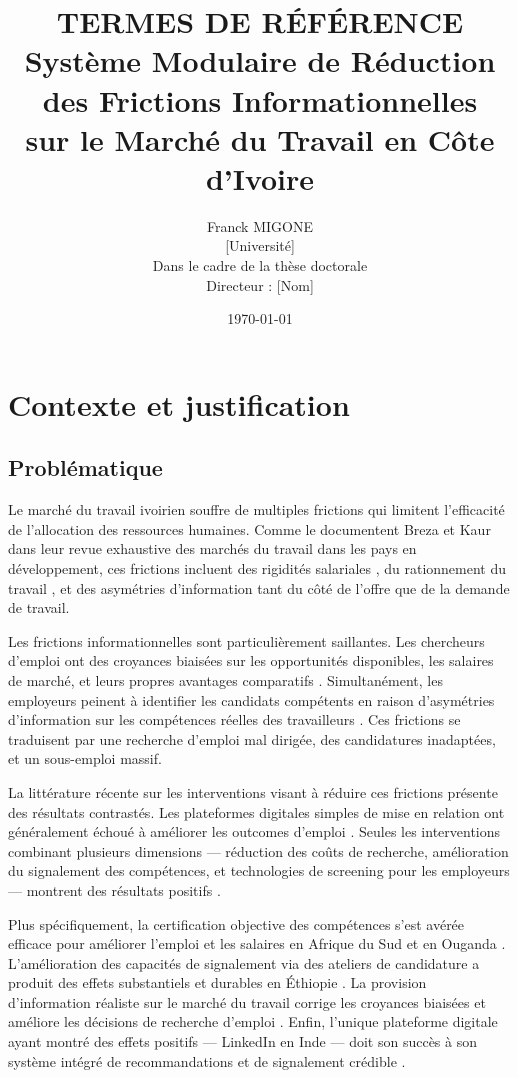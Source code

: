 \documentclass[12pt]{article}
\title{\textbf{TERMES DE RÉFÉRENCE}\\[0.5cm]
\large Système Modulaire de Réduction des Frictions Informationnelles\\
sur le Marché du Travail en Côte d'Ivoire}
\author{Franck MIGONE\\
\small [Université]\\
\small Dans le cadre de la thèse doctorale\\
\small Directeur : [Nom]}
\date{\today}
\begin{document}
\maketitle

\tableofcontents
\newpage

\section{Contexte et justification}

\subsection{Problématique}

Le marché du travail ivoirien souffre de multiples frictions qui limitent l'efficacité de l'allocation des ressources humaines. Comme le documentent Breza et Kaur \citeyearpar{breza2025} dans leur revue exhaustive des marchés du travail dans les pays en développement, ces frictions incluent des rigidités salariales \citep{kaur2019}, du rationnement du travail \citep{breza2021}, et des asymétries d'information tant du côté de l'offre que de la demande de travail.

Les frictions informationnelles sont particulièrement saillantes. Les chercheurs d'emploi ont des croyances biaisées sur les opportunités disponibles, les salaires de marché, et leurs propres avantages comparatifs \citep{bandiera2023, kiss2023}. Simultanément, les employeurs peinent à identifier les candidats compétents en raison d'asymétries d'information sur les compétences réelles des travailleurs \citep{hardy2023}. Ces frictions se traduisent par une recherche d'emploi mal dirigée, des candidatures inadaptées, et un sous-emploi massif.

La littérature récente sur les interventions visant à réduire ces frictions présente des résultats contrastés. Les plateformes digitales simples de mise en relation ont généralement échoué à améliorer les outcomes d'emploi \citep{carranza2024}. Seules les interventions combinant plusieurs dimensions — réduction des coûts de recherche, amélioration du signalement des compétences, et technologies de screening pour les employeurs — montrent des résultats positifs \citep{fernando2023}.

Plus spécifiquement, la certification objective des compétences s'est avérée efficace pour améliorer l'emploi et les salaires en Afrique du Sud \citep{carranza2022} et en Ouganda \citep{bassi2022}. L'amélioration des capacités de signalement via des ateliers de candidature a produit des effets substantiels et durables en Éthiopie \citep{abebe2021}. La provision d'information réaliste sur le marché du travail corrige les croyances biaisées et améliore les décisions de recherche d'emploi \citep{alfonsi2022}. Enfin, l'unique plateforme digitale ayant montré des effets positifs — LinkedIn en Inde — doit son succès à son système intégré de recommandations et de signalement crédible \citep{wheeler2022}.
\end{document}
